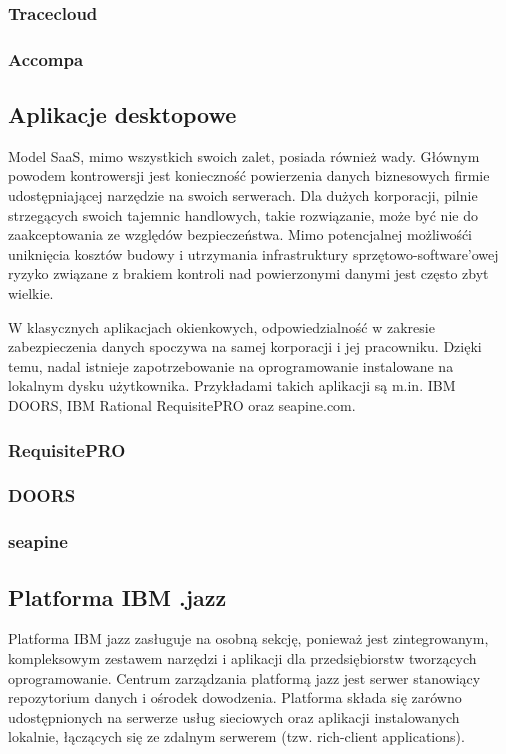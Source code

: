       \subsubsection{Tracecloud}
      \subsubsection{Accompa}

    \subsection{Aplikacje desktopowe}

      Model SaaS, mimo wszystkich swoich zalet, posiada również wady. Głównym powodem kontrowersji jest konieczność powierzenia danych biznesowych firmie udostępniającej narzędzie na swoich serwerach. Dla dużych korporacji, pilnie strzegących swoich tajemnic handlowych, takie rozwiązanie, może być nie do zaakceptowania ze względów bezpieczeństwa. Mimo potencjalnej możliwośći uniknięcia kosztów budowy i utrzymania infrastruktury sprzętowo-software'owej ryzyko związane z brakiem kontroli nad powierzonymi danymi jest często zbyt wielkie. 

      W klasycznych aplikacjach okienkowych, odpowiedzialność w zakresie zabezpieczenia danych spoczywa na samej korporacji i jej pracowniku. Dzięki temu, nadal istnieje zapotrzebowanie na oprogramowanie instalowane na lokalnym dysku użytkownika. Przykładami takich aplikacji są m.in. IBM DOORS, IBM Rational RequisitePRO oraz seapine.com. 

      \subsubsection{RequisitePRO}
      \subsubsection{DOORS}
      \subsubsection{seapine}

    \subsection{Platforma IBM .jazz}

      Platforma IBM jazz zasługuje na osobną sekcję, ponieważ jest zintegrowanym, kompleksowym zestawem narzędzi i aplikacji dla przedsiębiorstw tworzących oprogramowanie. Centrum zarządzania platformą jazz jest serwer stanowiący repozytorium danych i ośrodek dowodzenia. Platforma składa się zarówno udostępnionych na serwerze usług sieciowych oraz aplikacji instalowanych lokalnie, łączących się ze zdalnym serwerem (tzw. rich-client applications). 

